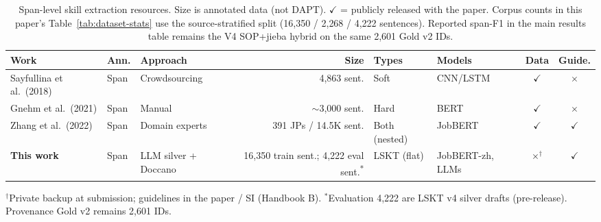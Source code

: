 \begin{table}[t]
\centering
\caption{Span-level skill extraction resources. Size is annotated data (not DAPT).
$\checkmark$ = publicly released with the paper.
Corpus counts in this paper's Table~\ref{tab:dataset-stats} use the source-stratified split (16{,}350 / 2{,}268 / 4{,}222 sentences).
Reported span-F1 in the main results table remains the V4 SOP+jieba hybrid on the same 2{,}601 Gold v2 IDs.}
\label{tab:related-span}
\scriptsize
\setlength{\tabcolsep}{3pt}
\begin{tabular}{l l l r l l c c}
\toprule
\textbf{Work} & \textbf{Ann.} & \textbf{Approach} & \textbf{Size} & \textbf{Types} & \textbf{Models} & \textbf{Data} & \textbf{Guide.} \\
\midrule
Sayfullina et al.\ (2018) & Span & Crowdsourcing & 4{,}863 sent. & Soft & CNN/LSTM & $\checkmark$ & $\times$ \\
Gnehm et al.\ (2021) & Span & Manual & $\sim$3{,}000 sent. & Hard & BERT & $\checkmark$ & $\times$ \\
Zhang et al.\ (2022) & Span & Domain experts & 391 JPs / 14.5K sent. & Both (nested) & JobBERT & $\checkmark$ & $\checkmark$ \\
\textbf{This work} & Span & LLM silver + Doccano & 16{,}350 train sent.; 4{,}222 eval sent.\textsuperscript{*} & LSKT (flat) & JobBERT-zh, LLMs & $\times^\dagger$ & $\checkmark$ \\
\bottomrule
\end{tabular}
\end{table}
\vspace{-0.4em}
{\scriptsize $^\dagger$Private backup at submission; guidelines in the paper / SI (Handbook B).
$^*$Evaluation 4{,}222 are LSKT v4 silver drafts (pre-release). Provenance Gold v2 remains 2{,}601 IDs.}
